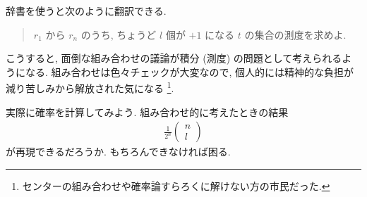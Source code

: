 \documentclass[openany, a4paper, oneside]{jsbook}
\theoremstyle{break}
\theoremstyle{breakdefn}
\begin{document}
辞書を使うと次のように翻訳できる.
\begin{quote}
$r_1$ から $r_n$ のうち, ちょうど $l$ 個が $+1$ になる $t$ の集合の測度を求めよ.
\end{quote}

こうすると, 面倒な組み合わせの議論が積分 (測度) の問題として考えられるようになる.
組み合わせは色々チェックが大変なので, 個人的には精神的な負担が減り苦しみから解放された気になる \footnote{センターの組み合わせや確率論すらろくに解けない方の市民だった.
 }.

実際に確率を計算してみよう.
組み合わせ的に考えたときの結果
\begin{align}
 \frac{1}{2^n}
 \begin{pmatrix}
  n \\
  l
 \end{pmatrix}
\end{align}
が再現できるだろうか.
もちろんできなければ困る.
\end{document}
